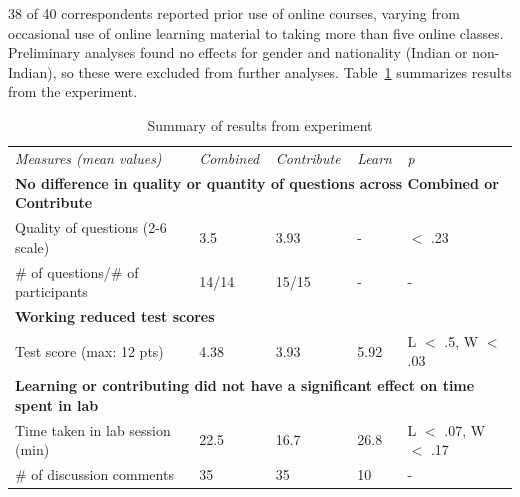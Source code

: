 38 of 40 correspondents reported prior use of online courses, varying from occasional use of online learning material to taking more than five online classes. Preliminary analyses found no effects for gender and nationality (Indian or non-Indian), so these were excluded from further analyses. Table~\ref{tab:gi-results1} summarizes results from the experiment. 

\vspace{0.25in}
\begin{table}[!ht]
\caption[Summary of results from experiment]{Summary of results from experiment}

\vspace{-0.25in}
\begin{center}
\renewcommand{\arraystretch}{1.5} %
\begin{tabular}{p{1in}p{1in}p{1in}p{1in}p{1.5in}}
\hline
\textit{Measures (mean values)}	& \textit{Combined} &	\textit{Contribute}	& \textit{Learn}	& {\it p} \\
\multicolumn{5}{l}{\bf No difference in quality or quantity of questions across Combined or Contribute}   \\
Quality of questions (2-6 scale)  &	3.5 &	3.93	&-	& $<$ .23\\
\# of questions/\# of participants &	14/14 &	15/15 &	- &	-\\
\multicolumn{2}{l}{\bf  Working reduced test scores}  & & & \\
Test score (max: 12 pts) & 4.38	& 3.93 & 5.92 & L $<$ .5, W $<$ .03 \\
\multicolumn{5}{l}{\bf Learning or contributing did not have a significant effect on time spent in lab }   \\
Time taken in lab session (min) & 22.5 & 16.7 & 26.8 & L $<$ .07, W $<$ .17\\
\# of discussion comments & 35 & 35 & 10 & - \\
\hline
\end{tabular}
\end{center}
\label{tab:gi-results1}
\end{table}

